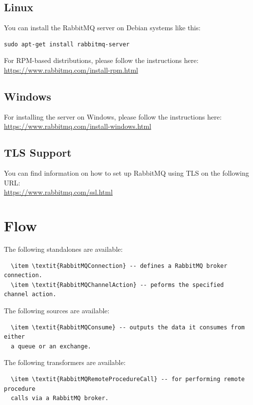\documentclass[a4paper]{book}
\begin{document}
\section{Linux}
You can install the RabbitMQ server on Debian systems like this:
\begin{verbatim}
sudo apt-get install rabbitmq-server
\end{verbatim}

\noindent For RPM-based distributions, please follow the instructions here: \\
\url{https://www.rabbitmq.com/install-rpm.html}{}

\section{Windows}
For installing the server on Windows, please follow the instructions here: \\
\url{https://www.rabbitmq.com/install-windows.html}{}

\section{TLS Support}
\label{tls_support}
You can find information on how to set up RabbitMQ using TLS on the
following URL: \\
\url{https://www.rabbitmq.com/ssl.html}{}

\chapter{Flow}
The following standalones are available:
\begin{verbatim}
  \item \textit{RabbitMQConnection} -- defines a RabbitMQ broker connection.
  \item \textit{RabbitMQChannelAction} -- peforms the specified channel action.
\end{verbatim}

The following sources are available:
\begin{verbatim}
  \item \textit{RabbitMQConsume} -- outputs the data it consumes from either
  a queue or an exchange.
\end{verbatim}

The following transformers are available:
\begin{verbatim}
  \item \textit{RabbitMQRemoteProcedureCall} -- for performing remote procedure
  calls via a RabbitMQ broker.
\end{verbatim}
\end{document}
